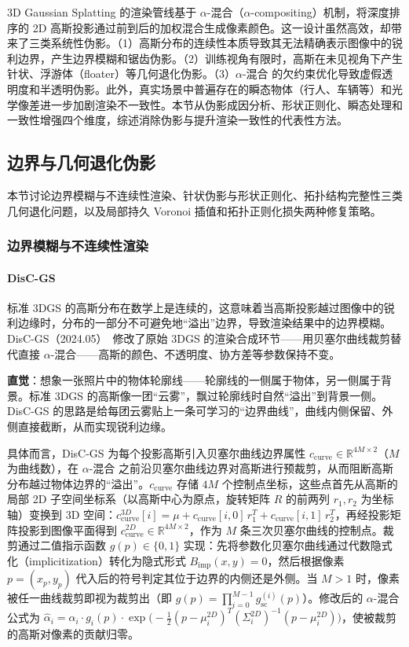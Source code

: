 3D Gaussian Splatting 的渲染管线基于 $\alpha$-混合（$\alpha$-compositing）机制，将深度排序的 2D 高斯投影通过前到后的加权混合生成像素颜色。这一设计虽然高效，却带来了三类系统性伪影。（1）高斯分布的连续性本质导致其无法精确表示图像中的锐利边界，产生边界模糊和锯齿伪影。（2）训练视角有限时，高斯在未见视角下产生针状、浮游体（floater）等几何退化伪影。（3）$\alpha$-混合 的欠约束优化导致虚假透明度和半透明伪影。此外，真实场景中普遍存在的瞬态物体（行人、车辆等）和光学像差进一步加剧渲染不一致性。本节从伪影成因分析、形状正则化、瞬态处理和一致性增强四个维度，综述消除伪影与提升渲染一致性的代表性方法。

\subsection{边界与几何退化伪影}

本节讨论边界模糊与不连续性渲染、针状伪影与形状正则化、拓扑结构完整性三类几何退化问题，以及局部持久 Voronoi 插值和拓扑正则化损失两种修复策略。

\subsubsection{边界模糊与不连续性渲染}

\paragraph{DisC-GS}
标准 3DGS 的高斯分布在数学上是连续的，这意味着当高斯投影越过图像中的锐利边缘时，分布的一部分不可避免地“溢出”边界，导致渲染结果中的边界模糊。DisC-GS（2024.05）~\cite{2405_15196}修改了原始 3DGS 的渲染合成环节——用贝塞尔曲线裁剪替代直接 $\alpha$-混合——高斯的颜色、不透明度、协方差等参数保持不变。

\textbf{直觉}：想象一张照片中的物体轮廓线——轮廓线的一侧属于物体，另一侧属于背景。标准 3DGS 的高斯像一团``云雾''，飘过轮廓线时自然``溢出''到背景一侧。DisC-GS 的思路是给每团云雾贴上一条可学习的``边界曲线''，曲线内侧保留、外侧直接截断，从而实现锐利边缘。

具体而言，DisC-GS 为每个投影高斯引入贝塞尔曲线边界属性 $c_{\text{curve}} \in \mathbb{R}^{4M \times 2}$（$M$ 为曲线数），在 $\alpha$-混合 之前沿贝塞尔曲线边界对高斯进行预裁剪，从而阻断高斯分布越过物体边界的``溢出''。$c_{\text{curve}}$ 存储 $4M$ 个控制点坐标，这些点首先从高斯的局部 2D 子空间坐标系（以高斯中心为原点，旋转矩阵 $R$ 的前两列 $r_1, r_2$ 为坐标轴）变换到 3D 空间：$c_{\text{curve}}^{3D}[i] = \mu + c_{\text{curve}}[i,0]\,r_1^T + c_{\text{curve}}[i,1]\,r_2^T$，再经投影矩阵投影到图像平面得到 $c_{\text{curve}}^{2D} \in \mathbb{R}^{4M \times 2}$，作为 $M$ 条三次贝塞尔曲线的控制点。裁剪通过二值指示函数 $g(p) \in \{0, 1\}$ 实现：先将参数化贝塞尔曲线通过代数隐式化（implicitization）转化为隐式形式 $B_{\text{imp}}(x,y) = 0$，然后根据像素 $p = (x_p, y_p)$ 代入后的符号判定其位于边界的内侧还是外侧。当 $M > 1$ 时，像素被任一曲线裁剪即视为裁剪出（即 $g(p) = \prod_{i=0}^{M-1} g_{\text{sc}}^{(i)}(p)$）。修改后的 $\alpha$-混合 公式为 $\hat{\alpha}_i = \alpha_i \cdot g_i(p) \cdot \exp\!\bigl(-\tfrac{1}{2}(p - \mu_i^{2D})^T (\Sigma_i^{2D})^{-1} (p - \mu_i^{2D})\bigr)$，使被裁剪的高斯对像素的贡献归零。


